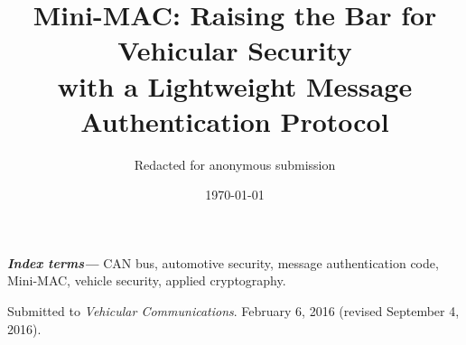 \documentclass[11pt,twocolumn]{article}
\providecommand{\keywords}[1]{\textbf{\textit{Index terms---}} #1}
\begin{document}

\title{Mini-MAC: Raising the Bar for Vehicular Security\\
with a Lightweight Message Authentication Protocol}


\author{Redacted for anonymous submission}

\begin{comment}
\author{Jackson Schmandt,$^1$
Alan T. Sherman,$^2$ 
Nilanjan Banerjee$^1$\\
CSEE Department, University of Maryland, Baltimore County (UMBC)\\
\{schmandt, sherman, nilanb\}@umbc.edu\\}
\end{comment}

\date{\today}

\maketitle




\keywords{CAN bus,
	automotive security,
	message authentication code,
	Mini-MAC,
	vehicle security,
	applied cryptography.
}
















	






\clearpage


%

\bigskip \noindent
Submitted to {\it Vehicular Communications}. 
{February 6, 2016 (revised September 4, 2016)}.

\end{document}
